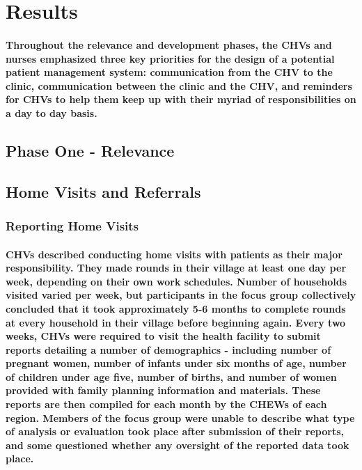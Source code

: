 \section{Results}
\paragraph{Throughout the relevance and development phases, the CHVs and nurses emphasized three key priorities for the design of a potential patient management system: communication from the CHV to the clinic, communication between the clinic and the CHV, and reminders for CHVs to help them keep up with their myriad of responsibilities on a day to day basis.} 


\subsection{Phase One - Relevance}

\subsection{Home Visits and Referrals}

\subsubsection{Reporting Home Visits}
\paragraph{CHVs described conducting home visits with patients as their major responsibility. They made rounds in their village at least one day per week, depending on their own work schedules. Number of households visited varied per week, but participants in the focus group collectively concluded that it took approximately 5-6 months to complete rounds at every household in their village before beginning again. Every two weeks, CHVs were required to visit the health facility to submit reports detailing a number of demographics - including number of pregnant women, number of infants under six months of age, number of children under age five, number of births, and number of women provided with family planning information and materials. These reports are then compiled for each month by the CHEWs of each region. Members of the focus group were unable to describe what type of analysis or evaluation took place after submission of their reports, and some questioned whether any oversight of the reported data took place.}

